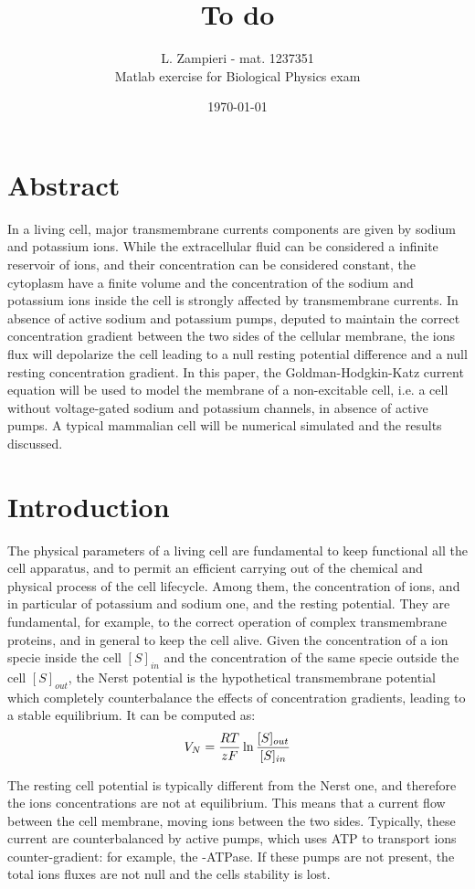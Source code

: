 \documentclass[11pt,a4 paper]{article}
\title{To do}
\author{L. Zampieri - mat. 1237351\\Matlab exercise for Biological Physics exam}
\date{\today}
\let\oldfrac\frac
\renewcommand{\frac}[3][d]{\ifthenelse{\equal{#1}{d}}{\oldfrac{#2}{#3}}{\nicefrac{#2}{#3}}}
\begin{document}
    
\maketitle

\section*{Abstract}
In a living cell, major transmembrane currents components are given by sodium and potassium ions. While the extracellular fluid can be considered a infinite reservoir of ions, and their concentration can be considered constant, the cytoplasm have a finite volume and the concentration of the sodium and potassium ions inside the cell is strongly affected by transmembrane currents. In absence of active sodium and potassium pumps, deputed to maintain the correct concentration gradient between the two sides of the cellular membrane, the ions flux will depolarize the cell leading to a null resting potential difference and a null resting concentration gradient. In this paper, the Goldman-Hodgkin-Katz current equation will be used to model the membrane of a non-excitable cell, i.e. a cell without voltage-gated sodium and potassium channels, in absence of active pumps. A typical mammalian cell will be numerical simulated and the results discussed.

\section{Introduction}
The physical parameters of a living cell are fundamental to keep functional all the cell apparatus, and to permit an efficient carrying out of the chemical and physical process of the cell lifecycle. Among them, the concentration of ions, and in particular of potassium and sodium one, and the resting potential. They are fundamental, for example, to the correct operation of complex transmembrane proteins, and in general to keep the cell alive. Given the concentration of a ion specie inside the cell $[S]_{in}$ and the concentration of the same specie outside the cell $[S]_{out}$, the Nerst potential is the hypothetical transmembrane potential which completely counterbalance the effects of concentration gradients, leading to a stable equilibrium. It can be computed as:
\begin{align*}
    V_N = \frac{RT}{zF} \ln\frac{[S]_{out}}{[S]_{in}}
\end{align*}

The resting cell potential is typically different from the Nerst one, and therefore the ions concentrations are not at equilibrium. This means that a current flow between the cell membrane, moving ions between the two sides. Typically, these current are counterbalanced by active pumps, which uses ATP to transport ions counter-gradient: for example, the -ATPase. If these pumps are not present, the total ions fluxes are not null and the cells stability is lost.
\end{document}
